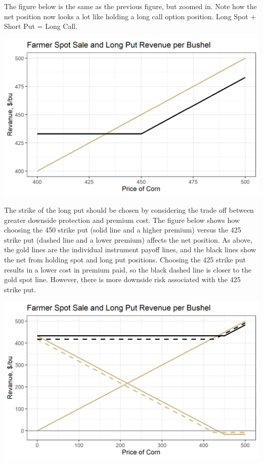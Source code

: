 \documentclass[
]{book}
\begin{document}
The figure below is the same as the previous figure, but zoomed in. Note how the net position now looks a lot like holding a long call option position. Long Spot + Short Put = Long Call.

\includegraphics{assets/Options4-spotputcombzoom.png}

The strike of the long put should be chosen by considering the trade off between greater downside protection and premium cost. The figure below shows how choosing the 450 strike put (solid line and a higher premium) versus the 425 strike put (dashed line and a lower premium) affects the net position. As above, the gold lines are the individual instrument payoff lines, and the black lines show the net from holding spot and long put positions. Choosing the 425 strike put results in a lower cost in premium paid, so the black dashed line is closer to the gold spot line. However, there is more downside risk associated with the 425 strike put.

\includegraphics{assets/Options4-spotputcombzoomchoice.png}
\end{document}
